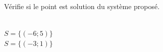 %
%
    Vérifie si le point est solution du système proposé.
    \begin{tasks}
        \task {} \\ $S = \bigl\{ (-6;5) \bigr\}$
        \task {} \\ $S = \bigl\{ (-3;1) \bigr\}$
    \end{tasks}
